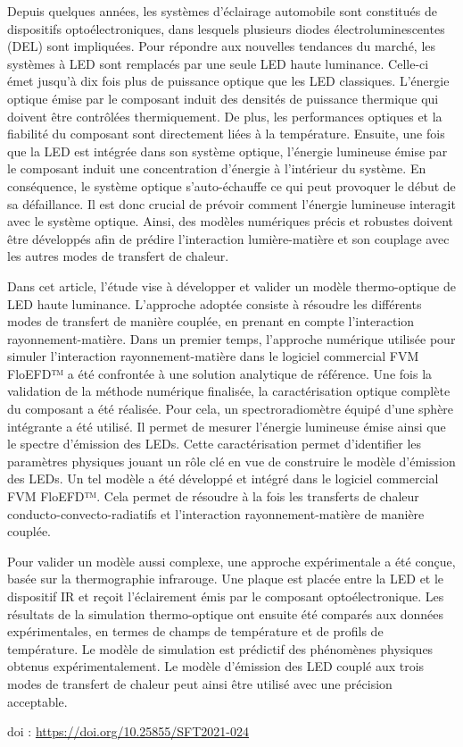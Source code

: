 {\normalsize
Depuis quelques années, les systèmes d'éclairage automobile sont constitués de dispositifs optoélectroniques, dans lesquels plusieurs diodes électroluminescentes (DEL) sont impliquées. Pour répondre aux nouvelles tendances du marché, les systèmes à LED sont remplacés par une seule LED haute luminance. Celle-ci émet jusqu'à dix fois plus de puissance optique que les LED classiques. L'énergie optique émise par le composant induit des densités de puissance thermique qui doivent être contrôlées thermiquement. De plus, les performances optiques et la fiabilité du composant sont directement liées à la température. Ensuite, une fois que la LED est intégrée dans son système optique, l'énergie lumineuse émise par le composant induit une concentration d'énergie à l'intérieur du système. En conséquence, le système optique s'auto-échauffe ce qui peut provoquer le début de sa défaillance. Il est donc crucial de prévoir comment l'énergie lumineuse interagit avec le système optique. Ainsi, des modèles numériques précis et robustes doivent être développés afin de prédire l'interaction lumière-matière et son couplage avec les autres modes de transfert de chaleur. 



Dans cet article, l'étude vise à développer et valider un modèle thermo-optique de LED haute luminance. L'approche adoptée consiste à résoudre les différents modes de transfert de manière couplée, en prenant en compte l'interaction rayonnement-matière. Dans un premier temps, l'approche numérique utilisée pour simuler l'interaction rayonnement-matière dans le logiciel commercial FVM FloEFD™ a été confrontée à une solution analytique de référence. Une fois la validation de la méthode numérique finalisée, la caractérisation optique complète du composant a été réalisée. Pour cela, un spectroradiomètre équipé d'une sphère intégrante a été utilisé. Il permet de mesurer l'énergie lumineuse émise ainsi que le spectre d'émission des LEDs. Cette caractérisation permet d'identifier les paramètres physiques jouant un rôle clé en vue de construire le modèle d'émission des LEDs. Un tel modèle a été développé et intégré dans le logiciel commercial FVM FloEFD™. Cela permet de résoudre à la fois les transferts de chaleur conducto-convecto-radiatifs et l'interaction rayonnement-matière de manière couplée.



Pour valider un modèle aussi complexe, une approche expérimentale a été conçue, basée sur la thermographie infrarouge. Une plaque est placée entre la LED et le dispositif IR et reçoit l'éclairement émis par le composant optoélectronique. Les résultats de la simulation thermo-optique ont ensuite été comparés aux données expérimentales, en termes de champs de température et de profils de température. Le modèle de simulation est prédictif des phénomènes physiques obtenus expérimentalement. Le modèle d'émission des LED couplé aux trois modes de transfert de chaleur peut ainsi être utilisé avec une précision acceptable.

 \vfill doi : \url{https://doi.org/10.25855/SFT2021-024}

}
 
